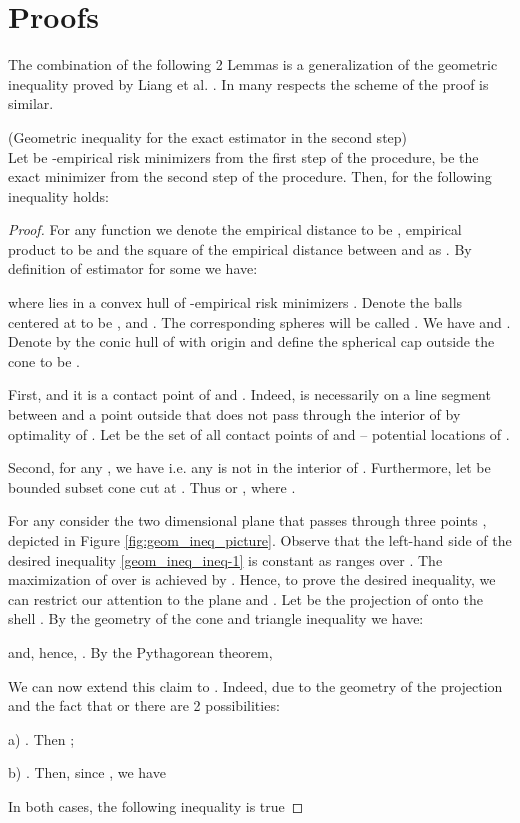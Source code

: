 \section{Proofs}\label{Appendix A}
    The combination of the following 2 Lemmas is a generalization of the geometric inequality proved by Liang et al. \cite{liang2015learning}. In many respects the scheme of the proof is similar.
    
    \begin{lemma}{(Geometric inequality for the exact  estimator in the second step)}\\
    \label{geom_ineq_lemma-1}
    Let  be -empirical risk minimizers from the first step of the  procedure,  be the exact minimizer from the second step of the  procedure. Then, for  the following inequality holds:
    
    \end{lemma}
\begin{proof}
    For any function  we denote the empirical  distance to be , empirical product to be  and the square of the empirical distance between  and  as
    . By definition of  estimator for some  we have:
        
    where  lies in a convex hull of -empirical risk minimizers .  Denote the balls centered at  to be ,  and . The corresponding spheres will be called . We have  and .
    Denote by  the conic hull of  with origin  and define the spherical cap outside the cone  to be .
    
    First,  and it is a contact point of  and . Indeed,  is necessarily on a line segment between  and a point outside  that does not pass through the interior of  by optimality of . Let  be the set of all contact points of  and  -- potential locations of .
    
    Second, for any , we have  i.e. any  is not in the interior of . Furthermore, let  be bounded subset cone  cut at . Thus  or , where .
    
    For any   consider the two dimensional plane  that passes through three points , depicted in Figure \ref{fig:geom_ineq_picture}. Observe that the left-hand side of the desired inequality \eqref{geom_ineq_ineq-1} is constant as  ranges over . The maximization of  over  is achieved by . 
    Hence, to prove the desired inequality, we can restrict our attention to the plane  and .
    Let  be the projection of  onto the shell .
By the geometry of the cone and triangle inequality we have:
    
    and, hence, .
    By the Pythagorean theorem,
    
    We can now extend this claim to . Indeed, due to the geometry of the projection  and the fact that  or   there are 2 possibilities:
    
    a) . Then ;
    
    b) . Then, since , we have
    
    In both cases, the following inequality is true
        
\end{proof}

